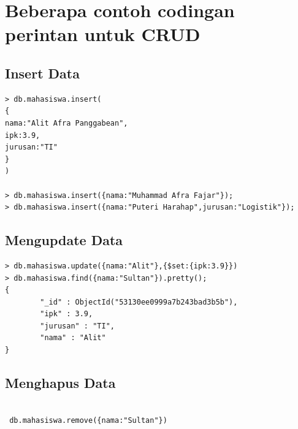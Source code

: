 \section{Beberapa contoh codingan perintan untuk CRUD}
\subsection{Insert Data}
\begin{verbatim} 
> db.mahasiswa.insert(
{
nama:"Alit Afra Panggabean", 
ipk:3.9,
jurusan:"TI"
}
)

> db.mahasiswa.insert({nama:"Muhammad Afra Fajar"});
> db.mahasiswa.insert({nama:"Puteri Harahap",jurusan:"Logistik"});

\end{verbatim}

\subsection{Mengupdate Data}
\begin{verbatim} 
> db.mahasiswa.update({nama:"Alit"},{$set:{ipk:3.9}})
> db.mahasiswa.find({nama:"Sultan"}).pretty();
{
        "_id" : ObjectId("53130ee0999a7b243bad3b5b"),
        "ipk" : 3.9,
        "jurusan" : "TI",
        "nama" : "Alit"
}

\end{verbatim}

\subsection{Menghapus Data}
\begin{verbatim} 

 db.mahasiswa.remove({nama:"Sultan"})
 
\end{verbatim}


\cite{inproceedingsemanuel2013perbandingan}
\cite{articletunardi2014nosql}
\cite{articleahsana2016pertukaran}



